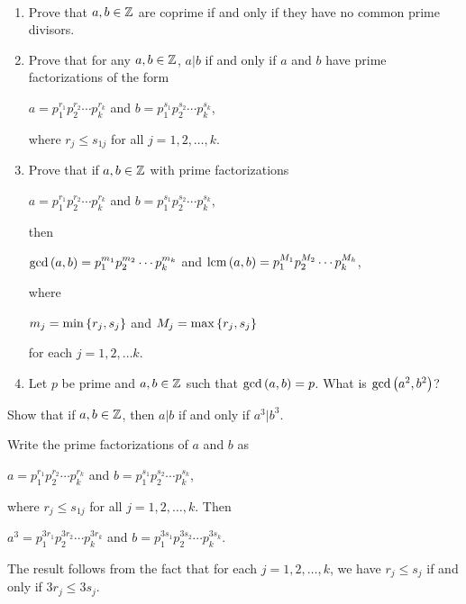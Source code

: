 \documentclass[11pt,fleqn,dvipsnames,usenames]{article}
\begin{document}
\begin{exercises}~
\begin{enumerate}[1.]
\item Prove that $a,b\in\mathbb{Z}$ are coprime if and only if they have no common prime divisors.
\item Prove that for any $a,b\in\mathbb{Z}$, $a|b$ if and only if $a$ and $b$ have prime factorizations of the form
\begin{center}
$a = p_{1}^{r_{1}}p_{2}^{r_{2}}\cdots p_{k}^{r_{k}}$ and $b = p_{1}^{s_{1}}p_{2}^{s_{2}}\cdots p_{k}^{s_{k}}$,
\end{center}
where $r_{j}\leq s_{1j}$ for all $j = 1,2,\ldots, k$.
\item Prove that if $a,b\in\mathbb{Z}$ with prime factorizations
\begin{center}
$a = p_{1}^{r_{1}}p_{2}^{r_{2}}\cdots p_{k}^{r_{k}}$ and $b = p_{1}^{s_{1}}p_{2}^{s_{2}}\cdots p_{k}^{s_{k}}$,
\end{center}
then
\begin{center}
$\text{gcd}\left(a,b\right) = p_{1}^{m_{1}}p_{2}^{m_{2}}\cdots p_{k}^{m_{k}}$ and $\text{lcm}\left(a,b\right) = p_{1}^{M_{1}}p_{2}^{M_{2}}\cdots p_{k}^{M_{k}}$,
\end{center}
where
\begin{center}
$m_{j} = \min\left\{r_{j},s_{j}\right\}$ and $M_{j} = \max\left\{r_{j},s_{j}\right\}$
\end{center}
for each $j=1,2,\ldots k$.
\item Let $p$ be prime and $a,b\in\mathbb{Z}$ such that $\text{gcd}\left(a,b\right) = p$.  What is $\text{gcd}\left(a^{2},b^{2}\right)$?
\end{enumerate}
\end{exercises}

\begin{example}
Show that if $a,b\in\mathbb{Z}$, then $a|b$ if and only if $a^3|b^3$.
\end{example}

\solution Write the prime factorizations of $a$ and $b$ as
\begin{center}
$a = p_{1}^{r_{1}}p_{2}^{r_{2}}\cdots p_{k}^{r_{k}}$ and $b = p_{1}^{s_{1}}p_{2}^{s_{2}}\cdots p_{k}^{s_{k}}$,
\end{center}
where $r_{j}\leq s_{1j}$ for all $j = 1,2,\ldots, k$.  Then
\begin{center}
$a^{3} = p_{1}^{3r_{1}}p_{2}^{3r_{2}}\cdots p_{k}^{3r_{k}}$ and $b = p_{1}^{3s_{1}}p_{2}^{3s_{2}}\cdots p_{k}^{3s_{k}}$.
\end{center}
The result follows from the fact that for each $j=1,2,\ldots, k$, we have $r_{j}\leq s_{j}$ if and only if $3r_{j}\leq 3s_{j}$.
\vsp
\end{document}
